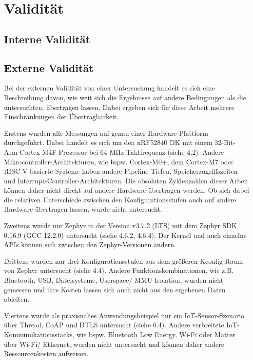 \chapter{Validität}


\section{Interne Validität}

\section{Externe Validität}
Bei der externen Validität von einer Untersuchung handelt es sich eine Beschreibung davon, wie weit sich die Ergebnisse auf andere Bedingungen als die untersuchten, übertragen lassen. Dabei ergeben sich für diese Arbeit mehrere Einschränkungen der Übertragbarkeit.

Erstens wurden alle Messungen auf genau einer Hardware-Plattform durchgeführt. Dabei handelt es sich um den nRF52840 DK mit einem 32-Bit-Arm-Cortex-M4F-Prozessor bei 64 MHz Taktfrequenz (siehe 4.2). Andere Mikrocontroller-Architekturen, wie bspw. Cortex-M0+, dem Cortex-M7 oder RISC-V-basierte Systeme haben andere Pipeline-Tiefen, Speicherzugriffszeiten und Interrupt-Controller-Architekturen. Die absoluten Zyklenzahlen dieser Arbeit können daher nicht direkt auf andere Hardware übertragen werden. Ob sich dabei die relativen Unterschiede zwischen den Konfigurationsstufen auch auf andere Hardware übertragen lassen, wurde nicht untersucht.

Zweitens wurde nur Zephyr in der Version v3.7.2 (LTS) mit dem Zephyr SDK 0.16.9 (GCC 12.2.0) untersucht (siehe 4.6.2, 4.6.4). Der Kernel und auch einzelne APIs können sich zwischen den Zephyr-Versionen ändern.

Drittens wurden nur drei Konfigurationsstufen aus dem größeren Kconfig-Raum von Zephyr untersucht (siehe 4.4). Andere Funktionskombinationen, wie z.B. Bluetooth, USB, Dateisysteme, Userspace/ MMU-Isolation, wurden nicht gemessen und ihre Kosten lassen sich auch nicht aus den ergebenen Daten ableiten.

Viertens wurde als praxisnahes Anwendungsbeispiel nur ein IoT-Sensor-Szenario über Thread, CoAP und DTLS untersucht (siehe 6.4). Andere verbreitete IoT-Kommunikationsstacks, wie bspw. Bluetooth Low Energy, Wi-Fi oder Matter über Wi-Fi/ Ethernet, wurden nicht untersucht und können daher andere Ressourcenkosten aufweisen.

